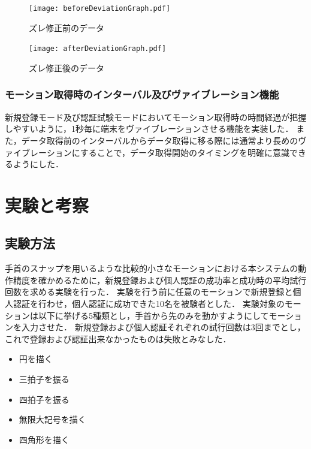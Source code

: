 \documentclass[11pt]{jreport}
\begin{document}
        \begin{figure}[tbp]
            \begin{minipage}{0.5\hsize}
                \begin{center}
                    \texttt{[image: beforeDeviationGraph.pdf]}
                \end{center}
                \caption{ズレ修正前のデータ}
                \label{beforeDeviationDataGraph}
            \end{minipage}
            \begin{minipage}{0.5\hsize}
                \begin{center}
                    \texttt{[image: afterDeviationGraph.pdf]}
                \end{center}
                \caption{ズレ修正後のデータ}
                \label{afterDeviationDataGraph}
            \end{minipage}
        \end{figure}

        \subsection{モーション取得時のインターバル及びヴァイブレーション機能}
        新規登録モード及び認証試験モードにおいてモーション取得時の時間経過が把握しやすいように，1秒毎に端末をヴァイブレーションさせる機能を実装した．
        また，データ取得前のインターバルからデータ取得に移る際には通常より長めのヴァイブレーションにすることで，データ取得開始のタイミングを明確に意識できるようにした．

\chapter{実験と考察}
	\section{実験方法}
    手首のスナップを用いるような比較的小さなモーションにおける本システムの動作精度を確かめるために，新規登録および個人認証の成功率と成功時の平均試行回数を求める実験を行った．
    実験を行う前に任意のモーションで新規登録と個人認証を行わせ，個人認証に成功できた10名を被験者とした．
    実験対象のモーションは以下に挙げる5種類とし，手首から先のみを動かすようにしてモーションを入力させた．
    新規登録および個人認証それぞれの試行回数は3回までとし，これで登録および認証出来なかったものは失敗とみなした．

    \begin{itemize}
        \item 円を描く
        \item 三拍子を振る
        \item 四拍子を振る
        \item 無限大記号を描く
        \item 四角形を描く
    \end{itemize}
\end{document}
